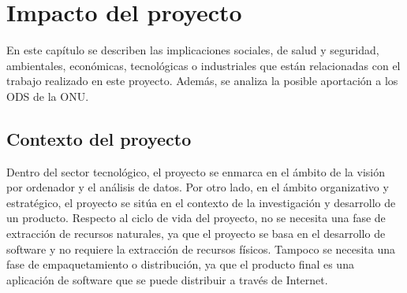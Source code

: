 \chapter{Impacto del proyecto} \label{sec:cap5}


    

\noindent En este capítulo se describen las implicaciones sociales, de salud y seguridad, ambientales, económicas, tecnológicas o industriales que están relacionadas con el trabajo realizado en este proyecto. Además, se analiza la posible aportación a los \ac{ODS} de la \ac{ONU}.

\section{Contexto del proyecto}

Dentro del sector tecnológico, el proyecto se enmarca en el ámbito de la visión por ordenador y el análisis de datos. Por otro lado, en el ámbito organizativo y estratégico, el proyecto se sitúa en el contexto de la investigación y desarrollo de un producto. Respecto al ciclo de vida del proyecto, no se necesita una fase de extracción de recursos naturales, ya que el proyecto se basa en el desarrollo de software y no requiere la extracción de recursos físicos. Tampoco se necesita una fase de empaquetamiento o distribución, ya que el producto final es una aplicación de software que se puede distribuir a través de Internet. 

